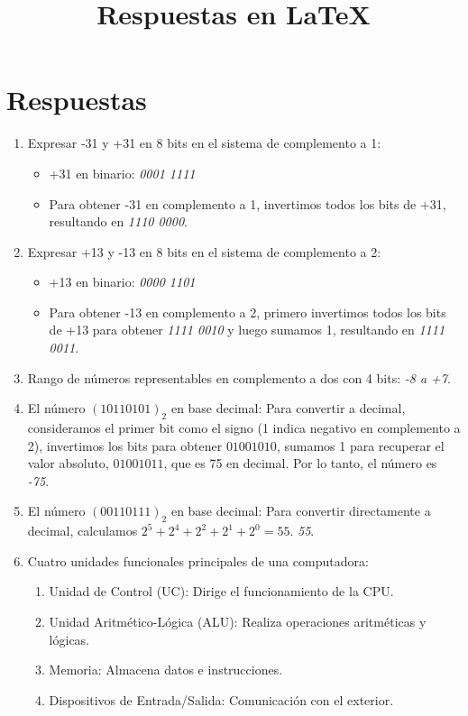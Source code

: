 \documentclass{article}
\begin{document}
\title{Respuestas en LaTeX}
\author{}
\date{}

\maketitle




\section*{Respuestas}

\begin{enumerate}
    \item Expresar -31 y +31 en 8 bits en el sistema de complemento a 1:
    \begin{itemize}
        \item +31 en binario: \textit{0001 1111}
        \item Para obtener -31 en complemento a 1, invertimos todos los bits de +31, resultando en \textit{1110 0000}.
    \end{itemize}
    
    \item Expresar +13 y -13 en 8 bits en el sistema de complemento a 2:
    \begin{itemize}
        \item +13 en binario: \textit{0000 1101}
        \item Para obtener -13 en complemento a 2, primero invertimos todos los bits de +13 para obtener \textit{1111 0010} y luego sumamos 1, resultando en \textit{1111 0011}.
    \end{itemize}
    
    \item Rango de números representables en complemento a dos con 4 bits: \textit{-8 a +7}.
    
    \item El número \((10110101)_2\) en base decimal: Para convertir a decimal, consideramos el primer bit como el signo (1 indica negativo en complemento a 2), invertimos los bits para obtener \(01001010\), sumamos 1 para recuperar el valor absoluto, \(01001011\), que es 75 en decimal. Por lo tanto, el número es \textit{-75}.
    
    \item El número \((00110111)_2\) en base decimal: Para convertir directamente a decimal, calculamos \(2^5 + 2^4 + 2^2 + 2^1 + 2^0 = 55\). \textit{55}.
    
    \item Cuatro unidades funcionales principales de una computadora:
    \begin{enumerate}
        \item Unidad de Control (UC): Dirige el funcionamiento de la CPU.
        \item Unidad Aritmético-Lógica (ALU): Realiza operaciones aritméticas y lógicas.
        \item Memoria: Almacena datos e instrucciones.
        \item Dispositivos de Entrada/Salida: Comunicación con el exterior.
    \end{enumerate}
    

\end{enumerate}
\end{document}
